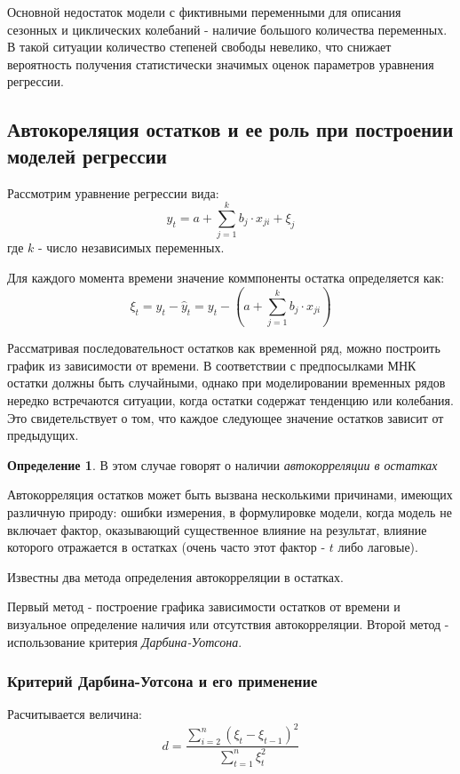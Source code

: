 \documentclass[aps,%
12pt,%
final,%
oneside,
onecolumn,%
musixtex, %
superscriptaddress,%
centertags]{article} %
\theoremstyle{plain}
\theoremstyle{definition}
\newtheorem{definition}{Определение}[subsection]
\theoremstyle{remark}
\begin{document}
Основной недостаток модели с фиктивными переменными для описания сезонных и циклических колебаний - наличие большого количества переменных. В такой ситуации количество степеней свободы невелико, что снижает вероятность получения статистически значимых оценок параметров уравнения регрессии.

\newpage
\subsection{Автокореляция остатков и ее роль при построении моделей регрессии}

Рассмотрим уравнение регрессии вида:
$$y_t = a + \sum\limits_{j=1}^k b_j \cdot x_{ji} + \xi_j$$
где $k$ - число независимых переменных.

Для каждого момента времени значение коммпоненты остатка определяется как:
$$\xi_t = y_t - \hat{y}_t = y_t - ( a + \sum\limits_{j=1}^k b_j \cdot x_{ji})$$

Рассматривая последовательност остатков как временной ряд, можно построить график из зависимости от времени. В соответствии с предпосылками МНК остатки должны быть случайными, однако при моделировании временных рядов нередко встречаются ситуации, когда остатки содержат тенденцию или колебания. Это свидетельствует о том, что каждое следующее значение остатков зависит от предыдущих.

\begin{definition}
	В этом случае говорят о наличии \textit{автокорреляции в остатках}
\end{definition}

Автокорреляция остатков может быть вызвана несколькими причинами, имеющих различную природу: ошибки измерения, в формулировке модели, когда модель не включает фактор, оказывающий существенное влияние на результат, влияние которого отражается в остатках (очень часто этот фактор - $t$ либо лаговые).

Известны два метода определения автокорреляции в остатках. 

Первый метод - построение графика зависимости остатков от времени и визуальное определение наличия или отсутствия автокорреляции. Второй метод - использование критерия \textit{Дарбина-Уотсона}.

\subsubsection{Критерий Дарбина-Уотсона и его применение}

Расчитывается величина:
$$d = \frac{\sum\limits_{i=2}^n (\xi_t - \xi_{t-1})^2}{\sum\limits_{t=1}^n \xi_t^2}$$
\end{document}
